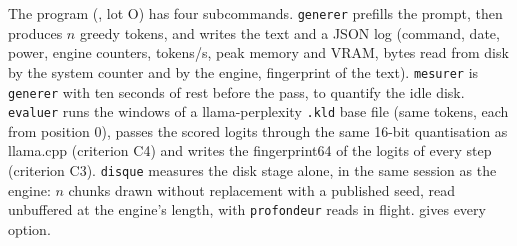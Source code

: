 The program (, lot O) has four subcommands. \texttt{generer} prefills the prompt, then produces $n$ greedy tokens, and writes the text and a JSON log (command, date, power, engine counters, tokens/s, peak memory and VRAM, bytes read from disk by the system counter and by the engine, fingerprint of the text). \texttt{mesurer} is \texttt{generer} with ten seconds of rest before the pass, to quantify the idle disk. \texttt{evaluer} runs the windows of a llama-perplexity \texttt{.kld} base file (same tokens, each from position 0), passes the scored logits through the same 16-bit quantisation as llama.cpp (criterion C4) and writes the fingerprint64 of the logits of every step (criterion C3). \texttt{disque} measures the disk stage alone, in the same session as the engine: $n$ chunks drawn without replacement with a published seed, read unbuffered at the engine's length, with \texttt{profondeur} reads in flight.  gives every option.

